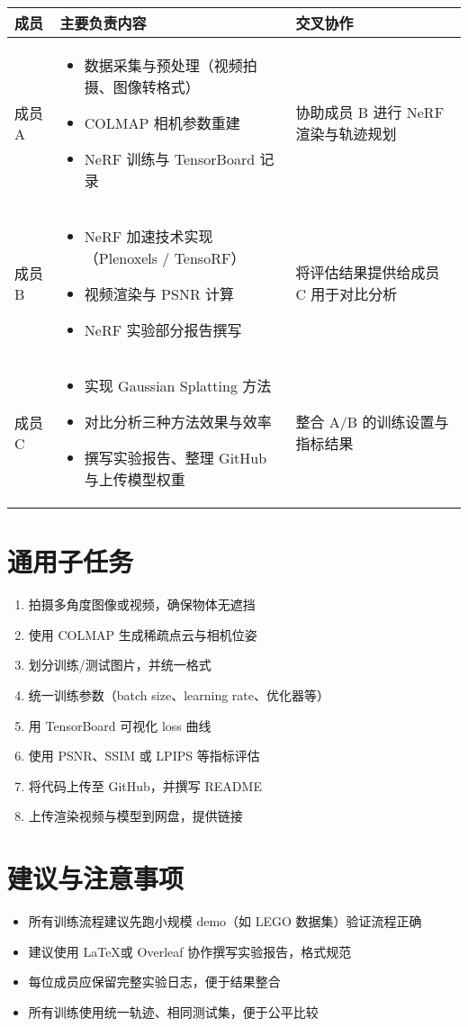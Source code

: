 \documentclass[a4paper,12pt]{article}
\begin{document}
\begin{longtable}{|p{3cm}|p{5.5cm}|p{5.5cm}|}
\hline
\textbf{成员} & \textbf{主要负责内容} & \textbf{交叉协作} \\
\hline
成员 A & 
\begin{itemize}[leftmargin=*]
    \item 数据采集与预处理（视频拍摄、图像转格式）
    \item COLMAP 相机参数重建
    \item NeRF 训练与 TensorBoard 记录
\end{itemize}
&
协助成员 B 进行 NeRF 渲染与轨迹规划 \\
\hline
成员 B &
\begin{itemize}[leftmargin=*]
    \item NeRF 加速技术实现（Plenoxels / TensoRF）
    \item 视频渲染与 PSNR 计算
    \item NeRF 实验部分报告撰写
\end{itemize}
&
将评估结果提供给成员 C 用于对比分析 \\
\hline
成员 C &
\begin{itemize}[leftmargin=*]
    \item 实现 Gaussian Splatting 方法
    \item 对比分析三种方法效果与效率
    \item 撰写实验报告、整理 GitHub 与上传模型权重
\end{itemize}
&
整合 A/B 的训练设置与指标结果 \\
\hline
\end{longtable}

\section{通用子任务}

\begin{enumerate}[label=(\arabic*)]
    \item 拍摄多角度图像或视频，确保物体无遮挡
    \item 使用 COLMAP 生成稀疏点云与相机位姿
    \item 划分训练/测试图片，并统一格式
    \item 统一训练参数（batch size、learning rate、优化器等）
    \item 用 TensorBoard 可视化 loss 曲线
    \item 使用 PSNR、SSIM 或 LPIPS 等指标评估
    \item 将代码上传至 GitHub，并撰写 README
    \item 上传渲染视频与模型到网盘，提供链接
\end{enumerate}

\section{建议与注意事项}

\begin{itemize}
    \item 所有训练流程建议先跑小规模 demo（如 LEGO 数据集）验证流程正确
    \item 建议使用 \LaTeX 或 Overleaf 协作撰写实验报告，格式规范
    \item 每位成员应保留完整实验日志，便于结果整合
    \item 所有训练使用统一轨迹、相同测试集，便于公平比较
\end{itemize}
\end{document}
